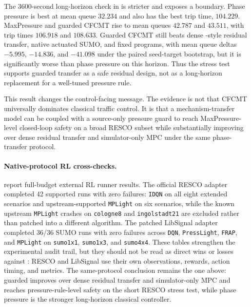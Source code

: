 The 3600-second long-horizon check in  is stricter and exposes a boundary.
Phase pressure is best at mean queue $32.234$ and also has the best trip time, $104.229$.
MaxPressure and guarded CFCMT rise to mean queues $42.787$ and $43.511$, with trip times $106.918$ and $108.633$.
Guarded CFCMT still beats dense \Htwo-style residual transfer, native actuated SUMO, and fixed programs, with mean queue deltas $-5.995$, $-14.836$, and $-41.098$ under the paired seed-target bootstrap, but it is significantly worse than phase pressure on this horizon.
Thus the stress test supports guarded transfer as a safe residual design, not as a long-horizon replacement for a well-tuned pressure rule.

This result changes the control-facing message.
The evidence is not that CFCMT universally dominates classical traffic control.
It is that a mechanism-transfer model can be coupled with a source-only pressure guard to reach MaxPressure-level closed-loop safety on a broad RESCO subset while substantially improving over dense residual transfer and simulator-only MPC under the same phase-transfer protocol.

\paragraph{Native-protocol RL cross-checks.}
 report full-budget external RL runner results.
The official RESCO adapter completed 42 supported runs with zero failures: \texttt{IDQN} on all eight extended scenarios and upstream-supported \texttt{MPLight} on six scenarios, while the known upstream \texttt{MPLight} crashes on \texttt{cologne8} and \texttt{ingolstadt21} are excluded rather than patched into a different algorithm.
The patched LibSignal adapter completed 36/36 SUMO runs with zero failures across \texttt{DQN}, \texttt{PressLight}, \texttt{FRAP}, and \texttt{MPLight} on \texttt{sumo1x1}, \texttt{sumo1x3}, and \texttt{sumo4x4}.
These tables strengthen the experimental audit trail, but they should not be read as direct wins or losses against \ours: RESCO and LibSignal use their own observations, rewards, action timing, and metrics.
The same-protocol conclusion remains the one above: guarded \ours improves over dense residual transfer and simulator-only MPC and reaches pressure-rule-level safety on the short RESCO stress test, while phase pressure is the stronger long-horizon classical controller.
